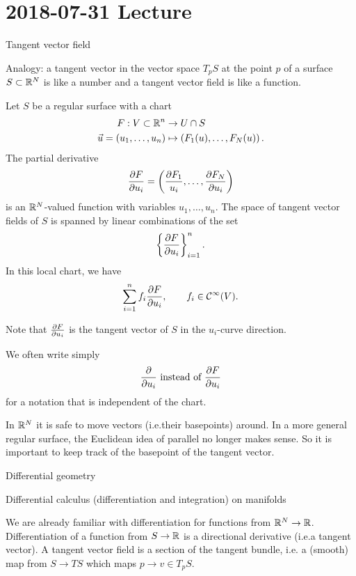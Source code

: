 \section{2018-07-31 Lecture}

Tangent vector field

Analogy: a tangent vector in the vector space $T_pS$ at the point $p$ of a surface $S \subset \mathbb{R}^N$ is like a number and a tangent vector field is like a function.

\begin{defn}
  Let $S$ be a regular surface with a chart
  \begin{align*}
    F: V \subset \mathbb{R}^n &\to U \cap S \\
    \vec u = (u_1,\ldots,u_n) &\mapsto \left( F_1(u),\ldots,F_N(u) \right).
  \end{align*}
  The partial derivative
  \[ \frac{\partial F}{\partial u_i} = \left( \frac{\partial F_1}{u_i}, \ldots, \frac{\partial F_N}{\partial u_i} \right) \]
  is an $\mathbb{R}^N$-valued function with variables $u_1,\ldots,u_n$.
  The space of tangent vector fields of $S$ is spanned by linear combinations of the set
  \[ \left\{ \frac{\partial F}{\partial u_i} \right\}_{i=1}^n. \]
  In this local chart, we have
  \[ \sum_{i=1}^n f_i \frac{\partial F}{\partial u_i}, \qquad f_i \in \mathcal{C}^\infty(V). \]
\end{defn}

\begin{rmk}
  Note that $\tfrac{\partial F}{\partial u_i}$ is the tangent vector of $S$ in the $u_i$-curve direction.
\end{rmk}

\begin{rmk}
  We often write simply
  \[ \frac{\partial}{\partial u_i} \text{ instead of } \frac{\partial F}{\partial u_i} \]
  for a notation that is independent of the chart.
\end{rmk}

\begin{rmk}
  In $\mathbb{R}^N$ it is safe to move vectors (i.e.\@ their basepoints) around.
  In a more general regular surface, the Euclidean idea of parallel no longer makes sense.
  So it is important to keep track of the basepoint of the tangent vector.
\end{rmk}

Differential geometry

Differential calculus (differentiation and integration) on manifolds

We are already familiar with differentiation for functions from $\mathbb{R}^N \to \mathbb{R}$.
Differentiation of a function from $S \to \mathbb{R}$ is a directional derivative (i.e.\@ a tangent vector).
A tangent vector field is a section of the tangent bundle, i.e. a (smooth) map from $S \to TS$ which maps $p \to v \in T_pS$.

